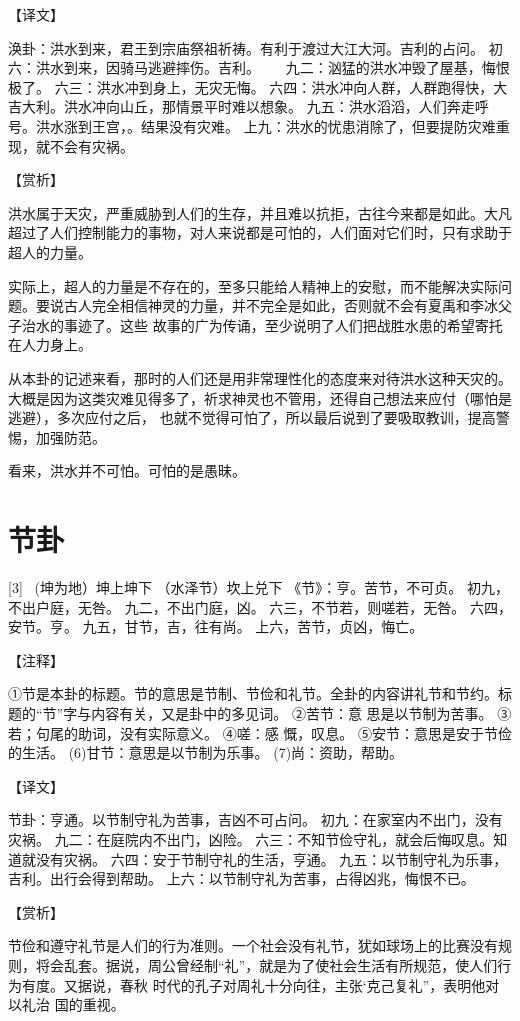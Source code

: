 \documentclass[12pt,UTF8]{ctexbook}
\begin{document}
【译文】

涣卦：洪水到来，君王到宗庙祭祖祈祷。有利于渡过大江大河。吉利的占问。
初六：洪水到来，因骑马逃避摔伤。吉利。　　
九二：汹猛的洪水冲毁了屋基，悔恨极了。
六三：洪水冲到身上，无灾无悔。
六四：洪水冲向人群，人群跑得快，大吉大利。洪水冲向山丘，那情景平时难以想象。
九五：洪水滔滔，人们奔走呼号。洪水涨到王宫，。结果没有灾难。
上九：洪水的忧患消除了，但要提防灾难重现，就不会有灾祸。

【赏析】

洪水属于天灾，严重威胁到人们的生存，并且难以抗拒，古往今来都是如此。大凡超过了人们控制能力的事物，对人来说都是可怕的，人们面对它们时，只有求助于超人的力量。

实际上，超人的力量是不存在的，至多只能给人精神上的安慰，而不能解决实际问题。要说古人完全相信神灵的力量，并不完全是如此，否则就不会有夏禹和李冰父子治水的事迹了。这些 故事的广为传诵，至少说明了人们把战胜水患的希望寄托在人力身上。

从本卦的记述来看，那时的人们还是用非常理性化的态度来对待洪水这种天灾的。大概是因为这类灾难见得多了，祈求神灵也不管用，还得自己想法来应付（哪怕是逃避），多次应付之后， 也就不觉得可怕了，所以最后说到了要吸取教训，提高警惕，加强防范。

看来，洪水并不可怕。可怕的是愚昧。

\chapter{节卦}
[3] \ (坤为地）坤上坤下
（水泽节）坎上兑下
《节》：亨。苦节，不可贞。
初九，不出户庭，无咎。
九二，不出门庭，凶。
六三，不节若，则嗟若，无咎。
六四，安节。亨。
九五，甘节，吉，往有尚。
上六，苦节，贞凶，悔亡。

【注释】

①节是本卦的标题。节的意思是节制、节俭和礼节。全卦的内容讲礼节和节约。标题的“节”字与内容有关，又是卦中的多见词。
②苦节：意 思是以节制为苦事。
③若；句尾的助词，没有实际意义。
④嗟：感 慨，叹息。
⑤安节：意思是安于节俭的生活。
(6)甘节：意思是以节制为乐事。
(7)尚：资助，帮助。

【译文】

节卦：亨通。以节制守礼为苦事，吉凶不可占问。
初九：在家室内不出门，没有灾祸。
九二：在庭院内不出门，凶险。
六三：不知节俭守礼，就会后悔叹息。知道就没有灾祸。
六四：安于节制守礼的生活，亨通。
九五：以节制守礼为乐事，吉利。出行会得到帮助。
上六：以节制守礼为苦事，占得凶兆，悔恨不已。

【赏析】

节俭和遵守礼节是人们的行为准则。一个社会没有礼节，犹如球场上的比赛没有规则，将会乱套。据说，周公曾经制“礼”，就是为了使社会生活有所规范，使人们行为有度。又据说，春秋 时代的孔子对周礼十分向往，主张‘克己复礼”，表明他对以礼治 国的重视。
\end{document}
